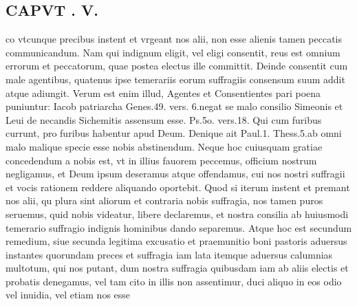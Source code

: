 \documentclass{article}
\begin{document}
\begin{pages}
\section*{CAPVT . V. }
\marginpar{[ p.339 ]}\pstart co vtcunque precibus instent et vrgeant nos alii, non esse alienis tamen peccatis communicandum. Nam qui indignum eligit, vel eligi consentit, reus est omnium errorum et peccatorum, quae postea electus ille committit. Deinde consentit cum male agentibus, quatenus ipse temerariis eorum suffragiis consensum suum addit atque adiungit. Verum est enim illud, Agentes et Consentientes pari poena puniuntur: Iacob patriarcha Genes.49. vers. 6.negat se malo consilio Simeonis et Leui de necandis Sichemitis assensum esse. Ps.5o. vers.18. Qui cum furibus currunt, pro furibus habentur apud Deum. Denique ait Paul.1. Thess.5.ab omni malo malique specie esse nobis abstinendum. Neque hoc cuiusquam gratiae concedendum a nobis est, vt in illius fauorem peccemus, officium nostrum negligamus, et Deum ipsum deseramus atque offendamus, cui nos nostri suffragii et vocis rationem reddere aliquando oportebit. Quod si iterum instent et premant nos alii, qu plura sint aliorum et contraria nobis suffragia, nos tamen puros seruemus, quid nobis videatur, libere declaremus, et nostra consilia ab huiusmodi temerario suffragio indignis hominibus dando separemus. Atque hoc est secundum remedium, siue secunda legitima excusatio et praemunitio boni pastoris aduersus instantes quorundam preces et suffragia iam lata itemque aduersus calumnias multotum, qui nos putant, dum nostra suffragia quibusdam iam ab aliis electis et probatis denegamus, vel tam cito in illis non assentimur, duci aliquo in eos odio vel inuidia, vel etiam nos esse  \pend

\end{pages}
\end{document}
